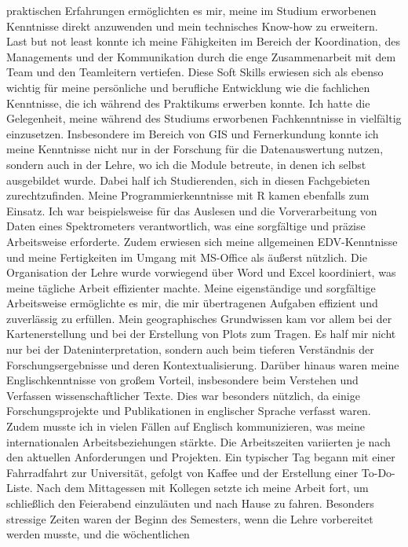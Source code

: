 \documentclass[12pt,a4paper]{report}
\begin{document}
praktischen Erfahrungen ermöglichten es mir, meine im Studium erworbenen
Kenntnisse direkt anzuwenden und mein technisches Know-how zu erweitern.
%
Last but not least konnte ich meine Fähigkeiten im Bereich der Koordination,
des Managements und der Kommunikation durch die enge Zusammenarbeit mit dem
Team und den Teamleitern vertiefen. Diese Soft Skills erwiesen sich als ebenso
wichtig für meine persönliche und berufliche Entwicklung wie die fachlichen
Kenntnisse, die ich während des Praktikums erwerben konnte.
Ich hatte die Gelegenheit, meine während des Studiums erworbenen Fachkenntnisse
in vielfältig einzusetzen. Insbesondere im Bereich von GIS und Fernerkundung
konnte ich meine Kenntnisse nicht nur in der Forschung für die Datenauswertung
nutzen, sondern auch in der Lehre, wo ich die Module betreute, in denen ich
selbst ausgebildet wurde. Dabei half ich Studierenden, sich in diesen
Fachgebieten zurechtzufinden.
%
Meine Programmierkenntnisse mit R kamen ebenfalls zum Einsatz. Ich war
beispielsweise für das Auslesen und die Vorverarbeitung von Daten eines
Spektrometers verantwortlich, was eine sorgfältige und präzise Arbeitsweise
erforderte. Zudem erwiesen sich meine allgemeinen EDV-Kenntnisse und meine
Fertigkeiten im Umgang mit MS-Office als äußerst nützlich. Die Organisation der
Lehre wurde vorwiegend über Word und Excel koordiniert, was meine tägliche
Arbeit effizienter machte.
%
Meine eigenständige und sorgfältige Arbeitsweise ermöglichte es mir, die mir
übertragenen Aufgaben effizient und zuverlässig zu erfüllen. Mein
geographisches Grundwissen kam vor allem bei der Kartenerstellung und bei der
Erstellung von Plots zum Tragen. Es half mir nicht nur bei der
Dateninterpretation, sondern auch beim tieferen Verständnis der
Forschungsergebnisse und deren Kontextualisierung.
%
Darüber hinaus waren meine Englischkenntnisse von großem Vorteil, insbesondere
beim Verstehen und Verfassen wissenschaftlicher Texte. Dies war besonders
nützlich, da einige Forschungsprojekte und Publikationen in englischer Sprache
verfasst waren. Zudem musste ich in vielen Fällen auf Englisch kommunizieren,
was meine internationalen Arbeitsbeziehungen stärkte.
Die Arbeitszeiten variierten je nach den aktuellen Anforderungen und Projekten.
Ein typischer Tag begann mit einer Fahrradfahrt zur Universität, gefolgt von
Kaffee und der Erstellung einer To-Do-Liste. Nach dem Mittagessen mit Kollegen
setzte ich meine Arbeit fort, um schließlich den Feierabend einzuläuten und
nach Hause zu fahren. Besonders stressige Zeiten waren der Beginn des
Semesters, wenn die Lehre vorbereitet werden musste, und die wöchentlichen
\end{document}
